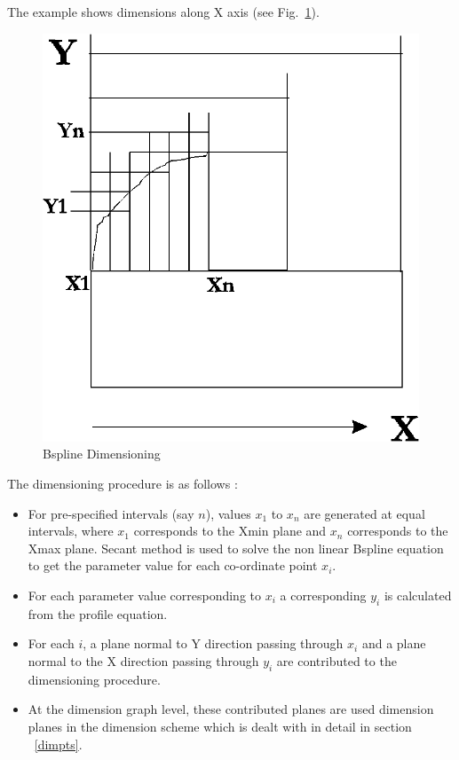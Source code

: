 	The example shows dimensions along X axis (see Fig.~\ref{ex2dim}).


        \begin{figure}[htbp]
                  \hspace{4cm}
            \includegraphics[scale=1]{BSPDIM.png}
            \caption{Bspline Dimensioning}
            \label{ex2dim}
        \end{figure}
        


        The dimensioning procedure is as follows :
            \begin{itemize}

            \item
            For pre-specified intervals (say $n$), values $x_{1}$ to $x_{n}$
            are generated at equal intervals, where $x_{1}$ corresponds to the
            Xmin plane and $x_{n}$ corresponds to the Xmax plane.
			Secant method is used to solve the non linear Bspline equation 
			to get the parameter value for each co-ordinate point $x_{i}$.

            \item
            For each parameter value corresponding to $x_{i}$ a corresponding 
			$y_{i}$ is calculated from the profile equation.

            \item
            For each $i$, a plane normal to Y direction passing through $x_{i}$
            and a plane normal to the X direction passing through $y_{i}$ are
            contributed to the dimensioning procedure.

			\item
			At the dimension graph level, these contributed planes are used
			dimension planes in the dimension scheme which is dealt with in
            detail in section ~\ref{dimpts}.
			\end{itemize}

